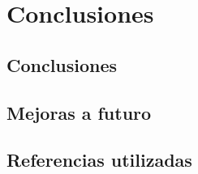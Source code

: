 \chapter{Conclusiones}
\thispagestyle{empty}

\section{Conclusiones}

\section{Mejoras a futuro}

\section{Referencias utilizadas}